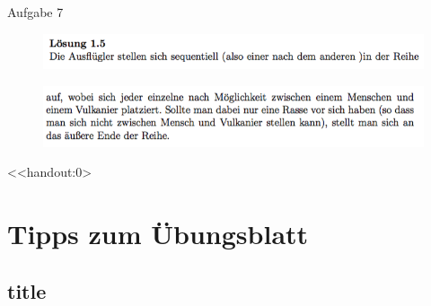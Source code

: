 \begin{frame}{Aufgabe 7}
\begin{figure}[h!]
		\centering
		\includegraphics[width=\textwidth]{19.png} 
	\end{figure}  
	\begin{figure}[h!]
		\centering
		\includegraphics[width=\textwidth]{20.png} 
	\end{figure}   
\end{frame}

\mode<<handout:0>{

\section{Tipps zum Übungsblatt}
\subsection{title}
} 

\section{}
\questionframe
{}
